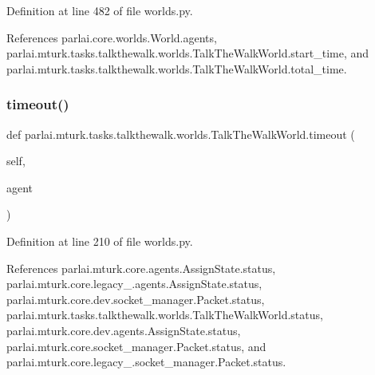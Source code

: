Definition at line 482 of file worlds.\+py.



References parlai.\+core.\+worlds.\+World.\+agents, parlai.\+mturk.\+tasks.\+talkthewalk.\+worlds.\+Talk\+The\+Walk\+World.\+start\+\_\+time, and parlai.\+mturk.\+tasks.\+talkthewalk.\+worlds.\+Talk\+The\+Walk\+World.\+total\+\_\+time.

\mbox{\label{classparlai_1_1mturk_1_1tasks_1_1talkthewalk_1_1worlds_1_1TalkTheWalkWorld_afd6fc4ead1a01da85a024a633e2232e3}} 
\subsubsection{\texorpdfstring{timeout()}{timeout()}}
{\footnotesize\ttfamily def parlai.\+mturk.\+tasks.\+talkthewalk.\+worlds.\+Talk\+The\+Walk\+World.\+timeout (\begin{DoxyParamCaption}\item[{}]{self,  }\item[{}]{agent }\end{DoxyParamCaption})}



Definition at line 210 of file worlds.\+py.



References parlai.\+mturk.\+core.\+agents.\+Assign\+State.\+status, parlai.\+mturk.\+core.\+legacy\+\_.\+agents.\+Assign\+State.\+status, parlai.\+mturk.\+core.\+dev.\+socket\+\_\+manager.\+Packet.\+status, parlai.\+mturk.\+tasks.\+talkthewalk.\+worlds.\+Talk\+The\+Walk\+World.\+status, parlai.\+mturk.\+core.\+dev.\+agents.\+Assign\+State.\+status, parlai.\+mturk.\+core.\+socket\+\_\+manager.\+Packet.\+status, and parlai.\+mturk.\+core.\+legacy\+\_.\+socket\+\_\+manager.\+Packet.\+status.

\mbox{\label{classparlai_1_1mturk_1_1tasks_1_1talkthewalk_1_1worlds_1_1TalkTheWalkWorld_a30adb3fe817fef8f40a6a2f61773972d}} 
